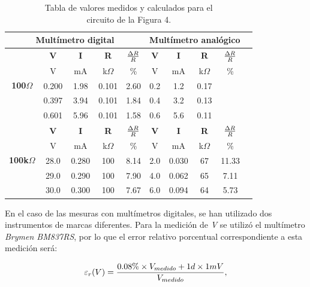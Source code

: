 \documentclass{article}
\begin{document}
\begin{table}[!hbt]
	\begin{center}

		\begin{tabular}{|c|c|c|c|c|c|c|c|c|c|} \hline
			\multicolumn{5}{|c|}{\textbf{Multímetro digital}} & \multicolumn{4}{|c|}{\textbf{Multímetro analógico}} \\ \hline
			\multirow{5}{*}{\textbf{100$\Omega$}} 
			& \textbf{V} & \textbf{I} & \textbf{R} & \textbf{${\Delta R \over R}$} & \textbf{V} & \textbf{I} & \textbf{R} & \textbf{${\Delta R \over R}$} \\\cline{2-9}
			& V & mA & k$\Omega$ & \% & V & mA & k$\Omega$ & \% \\\cline{2-9}
			& 0.200 & 1.98 & 0.101 & 2.60 & 0.2 & 1.2 & 0.17 &  \\\cline{2-9}
			& 0.397 & 3.94 & 0.101 & 1.84 & 0.4 & 3.2 & 0.13 &  \\\cline{2-9}
			& 0.601 & 5.96 & 0.101 & 1.58 & 0.6 & 5.6 & 0.11 &  \\ \hline
			\multirow{5}{*}{\textbf{100k$\Omega$}} 
			& \textbf{V} & \textbf{I} & \textbf{R} & \textbf{${\Delta R \over R}$} & \textbf{V} & \textbf{I} & \textbf{R} & \textbf{${\Delta R \over R}$} \\\cline{2-9}
			& V & mA & k$\Omega$ & \% & V & mA & k$\Omega$ & \% \\\cline{2-9}
			& 28.0 & 0.280 & 100 & 8.14 & 2.0 & 0.030 & 67 & 11.33 \\\cline{2-9}
			& 29.0 & 0.290 & 100 & 7.90 & 4.0 & 0.062 & 65 & 7.11 \\\cline{2-9}
			& 30.0 & 0.300 & 100 & 7.67 & 6.0 & 0.094 & 64 & 5.73 \\ \hline
		\end{tabular}

	\caption{Tabla de valores medidos y calculados para el\\ circuito de la Figura 4.}
	\end{center}
\end{table}
\bigskip


	En el caso de las mesuras con multímetros digitales, se han utilizado dos instrumentos de marcas diferentes. Para la medición de \textit{V} se utilizó el multímetro \textit{Brymen BM837RS}, por lo que el error relativo porcentual correspondiente a esta medición será:
\medskip

\begin{equation}
 	\varepsilon_r(V) = {0.08\%\times V_{medido} + 1d\times 1mV \over V_{medido}},
\end{equation}
\medskip
\end{document}
